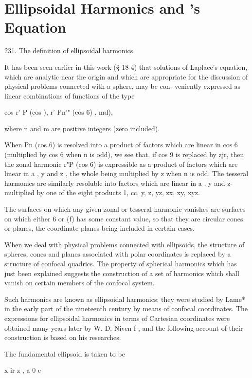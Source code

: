 \chapter{Ellipsoidal Harmonics and \Lame's Equation}

231. The definition of ellipsoidal harmonics.

It has been seen earlier in this work (§ 18-4) that solutions of
Laplace's equation, which are analytic near the origin and which are
appropriate for the discussion of physical problems connected with a
sphere, may be con- veniently expressed as linear combinations of
functions of the type

cos r' P (cos ), r' Pn'" (cos 6) . md),

where n and m are positive integers (zero included).

When Pn (cos 6) is resolved into a product of factors which are linear
in cos 6 (multiplied by cos 6 when n is odd), we see that, if cos 9 is
replaced by zjr, then the zonal harmonic r"P (cos 6) is expressible as
a product of factors which are linear in a , y and z , the whole being
multiplied by z when n is odd. The tesseral harmonics are similarly
resoluble into factors which are linear in a , y and z- multiplied by
one of the eight products 1, cc, y, z, yz, zx, xy, xyz.

The surfaces on which any given zonal or tesseral harmonic vanishes
are surfaces on which either 6 or (f) has some constant value, so that
they are circular cones or planes, the coordinate planes being
included in certain cases.

When we deal with physical problems connected with ellipsoids, the
structure of spheres, cones and planes associated with polar
coordinates is replaced by a structure of confocal quadrics. The
property of spherical harmonics which has just been explained suggests
the construction of a set of harmonics which shall vanish on certain
members of the confocal system.

Such harmonics are known as ellipsoidal harmonics; they were studied
by Lame* in the early part of the nineteenth century by means of
confocal coordinates. The expressions for ellipsoidal harmonics in
terms of Cartesian coordinates were obtained many years later by W. D.
Niven-f-, and the following account of their construction is based on
his researches.

The fundamental ellipsoid is taken to be



x ir z , a 0 c



